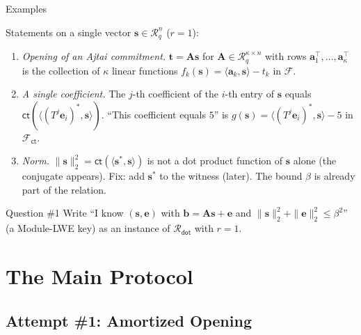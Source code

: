 \documentclass{zkdl-presentation-template}
\begin{document}
    \begin{frame}{Examples}
        \begin{example}
            Statements on a single vector $\mathbf{s} \in \mathcal{R}_q^n$ ($r = 1$):
            \begin{enumerate}
                \item \textit{Opening of an Ajtai commitment.} $\mathbf{t} = \mathbf{A}\mathbf{s}$ for $\mathbf{A} \in \mathcal{R}_q^{\kappa \times n}$ with rows $\mathbf{a}_1^{\top}, \dots, \mathbf{a}_{\kappa}^{\top}$ is the collection of $\kappa$ linear functions $f_k(\mathbf{s}) = \langle \mathbf{a}_k, \mathbf{s} \rangle - t_k$ in $\mathcal{F}$.\pause
                \item \textit{A single coefficient.} The $j$-th coefficient of the $i$-th entry of $\mathbf{s}$ equals $\mathsf{ct}(\langle (T^j\mathbf{e}_i)^{\ast}, \mathbf{s} \rangle)$. ``This coefficient equals $5$'' is $g(\mathbf{s}) = \langle (T^j\mathbf{e}_i)^{\ast}, \mathbf{s} \rangle - 5$ in $\mathcal{F}_{\mathsf{ct}}$.\pause
                \item \textit{Norm.} $\|\mathbf{s}\|_2^2 = \mathsf{ct}(\langle \mathbf{s}^{\ast}, \mathbf{s} \rangle)$ is not a dot product function of $\mathbf{s}$ alone (the conjugate appears). Fix: add $\mathbf{s}^{\ast}$ to the witness (later). The bound $\beta$ is already part of the relation.
            \end{enumerate}
        \end{example}
        \pause

        \begin{questionblock}{Question \#1}
            Write ``I know $(\mathbf{s}, \mathbf{e})$ with $\mathbf{b} = \mathbf{A}\mathbf{s} + \mathbf{e}$ and $\|\mathbf{s}\|_2^2 + \|\mathbf{e}\|_2^2 \leq \beta^2$'' (a Module-LWE key) as an instance of $\mathcal{R}_{\mathsf{dot}}$ with $r = 1$.
        \end{questionblock}
    \end{frame}

    \section{The Main Protocol}

    \subsection{Attempt \#1: Amortized Opening}
\end{document}
